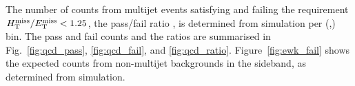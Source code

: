 The number of counts from multijet events satisfying and failing the
requirement $\mbox{$\mbox{$H_{\rm T}^{\rm miss}$} / \mbox{$E_\text{T}^{\rm miss}$}$} < 1.25$, \ie the pass/fail ratio \rmhtmet, is
determined from simulation per (\njet,\scalht) bin. The pass and fail
counts and the ratios are summarised in Fig.~\ref{fig:qcd_pass},
\ref{fig:qcd_fail}, and \ref{fig:qcd_ratio}. Figure~\ref{fig:ewk_fail}
shows the expected counts from non-multijet backgrounds in the \mhtmet
sideband, as determined from simulation.

\begin{figure}[!h]
  \centering
   \\
\end{figure}
